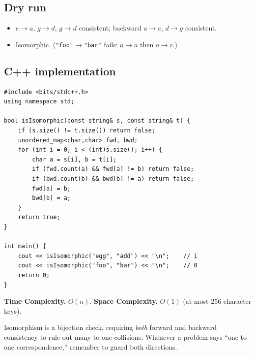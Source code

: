 \subsection*{Dry run}


\begin{itemize}
  \item $e\to a$, $g\to d$, $g\to d$ consistent; backward $a\to e$,
        $d\to g$ consistent.
  \item Isomorphic. (\texttt{"foo"}$\to$\texttt{"bar"} fails: $o\to a$ then
        $o\to r$.)
\end{itemize}

\subsection*{C++ implementation}

\begin{lstlisting}
#include <bits/stdc++.h>
using namespace std;

bool isIsomorphic(const string& s, const string& t) {
    if (s.size() != t.size()) return false;
    unordered_map<char,char> fwd, bwd;
    for (int i = 0; i < (int)s.size(); i++) {
        char a = s[i], b = t[i];
        if (fwd.count(a) && fwd[a] != b) return false;
        if (bwd.count(b) && bwd[b] != a) return false;
        fwd[a] = b;
        bwd[b] = a;
    }
    return true;
}

int main() {
    cout << isIsomorphic("egg", "add") << "\n";    // 1
    cout << isIsomorphic("foo", "bar") << "\n";    // 0
    return 0;
}
\end{lstlisting}

\begin{complexitybox}
\textbf{Time Complexity.} $O(n)$. \textbf{Space Complexity.} $O(1)$ (at most
$256$ character keys).
\end{complexitybox}

\begin{takeawaybox}
Isomorphism is a bijection check, requiring \emph{both} forward and backward
consistency to rule out many-to-one collisions. Whenever a problem says
``one-to-one correspondence,'' remember to guard both directions.
\end{takeawaybox}
